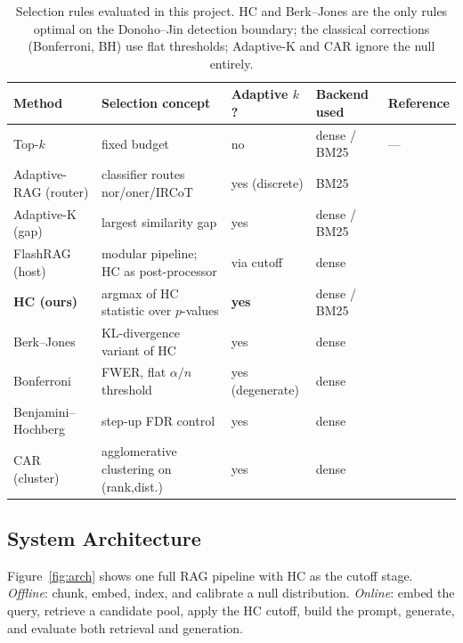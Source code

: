 \documentclass[letterpaper]{article}
\begin{document}
\begin{table}[t]
\centering
\small
\begin{tabular}{lllll}
\toprule
\textbf{Method} & \textbf{Selection concept} & \textbf{Adaptive $k$?} & \textbf{Backend used} & \textbf{Reference} \\
\midrule
Top-$k$            & fixed budget                              & no                 & dense / BM25   & --- \\
Adaptive-RAG (router) & classifier routes nor/oner/IRCoT       & yes (discrete)     & BM25           & \cite{jeong2024adaptiverag} \\
Adaptive-K (gap)   & largest similarity gap                    & yes                & dense / BM25   & \cite{adaptivek2025} \\
FlashRAG (host)    & modular pipeline; HC as post-processor    & via cutoff         & dense          & \cite{jin2025flashrag} \\
\textbf{HC (ours)} & argmax of HC statistic over $p$-values    & \textbf{yes}       & dense / BM25   & \cite{donohojin2004hc} \\
Berk--Jones        & KL-divergence variant of HC               & yes                & dense          & \cite{berkjones1979} \\
Bonferroni         & FWER, flat $\alpha/n$ threshold            & yes (degenerate)   & dense          & \cite{bonferroni1961dunn} \\
Benjamini--Hochberg& step-up FDR control                       & yes                & dense          & \cite{benjamini1995fdr} \\
CAR (cluster)      & agglomerative clustering on (rank,dist.)  & yes                & dense          & \cite{xu2025car} \\
\bottomrule
\end{tabular}
\caption{Selection rules evaluated in this project. HC and Berk--Jones
are the only rules optimal on the Donoho--Jin detection boundary; the
classical corrections (Bonferroni, BH) use flat thresholds; Adaptive-K
and CAR ignore the null entirely.}
\label{tab:pipelines}
\end{table}

\subsection{System Architecture}
Figure~\ref{fig:arch} shows one full RAG pipeline with HC as the cutoff
stage. \emph{Offline}: chunk, embed, index, and calibrate a null
distribution. \emph{Online}: embed the query, retrieve a candidate
pool, apply the HC cutoff, build the prompt, generate, and evaluate
both retrieval and generation.
\end{document}
